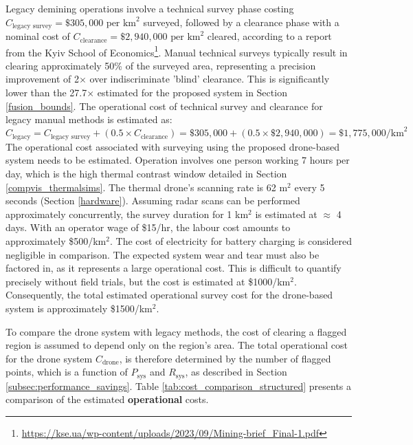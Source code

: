 Legacy demining operations involve a technical survey phase costing $C_\text{legacy survey} = \$305,000 \text{ per km}^2$ surveyed, followed by a clearance phase with a nominal cost of $C_\text{clearance} = \$2,940,000 \text{ per km}^2$ cleared, according to a report from the Kyiv School of Economics\footnote{\url{https://kse.ua/wp-content/uploads/2023/09/Mining-brief_Final-1.pdf}}. Manual technical surveys typically result in clearing approximately 50\% of the surveyed area, representing a precision improvement of 2$\times$ over indiscriminate 'blind' clearance. This is significantly lower than the 27.7$\times$ estimated for the proposed system in Section \ref{fusion_bounds}. The operational cost of technical survey and clearance for legacy manual methods is estimated as:
\begin{equation}
C_{\text{legacy}} = C_{\text{legacy survey}} + (0.5 \times C_{\text{clearance}}) = \$305,000 + (0.5 \times \$2,940,000) = \$1,775,000 \text{/km}^2 
\end{equation}
The operational cost associated with surveying using the proposed drone-based system needs to be estimated. Operation involves one person working 7 hours per day, which is the high thermal contrast window detailed in Section \ref{compvis_thermalsims}. The thermal drone's scanning rate is 62 m$^2$ every 5 seconds (Section \ref{hardware}). Assuming radar scans can be performed approximately concurrently, the survey duration for 1 km$^2$ is estimated at $\approx$ 4 days. With an operator wage of \$15/hr, the labour cost amounts to approximately \$500/km$^2$. The cost of electricity for battery charging is considered negligible in comparison. The expected system wear and tear must also be factored in, as it represents a large operational cost. This is difficult to quantify precisely without field trials, but the cost is estimated at \$1000/km$^2$. Consequently, the total estimated operational survey cost for the drone-based system is approximately \$1500/km$^2$.

To compare the drone system with legacy methods, the cost of clearing a flagged region is assumed to depend only on the region's area. The total operational cost for the drone system $C_{\text{drone}}$, is therefore determined by the number of flagged points, which is a function of $P_\text{sys}$ and $R_\text{sys}$, as described in Section \ref{subsec:performance_savings}. Table \ref{tab:cost_comparison_structured} presents a comparison of the estimated \textbf{operational} costs.

